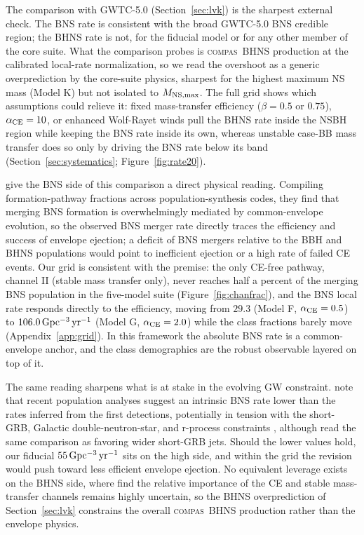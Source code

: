 \documentclass[twocolumn,amsmath]{aastex702}
\newcommand{\compas}{\textsc{compas}}
\newcommand{\Gpcyr}{{\rm Gpc^{-3}\,yr^{-1}}}
\begin{document}
The comparison with GWTC-5.0 (Section~\ref{sec:lvk}) is the sharpest external
check. The BNS rate is consistent with the broad GWTC-5.0 BNS credible region;
the BHNS rate is not, for the fiducial model or for any other member of the
core suite. What the comparison probes is \compas\ BHNS production at the
calibrated local-rate normalization, so we read the overshoot as a generic
overprediction by the core-suite physics, sharpest for the highest maximum NS
mass (Model K) but not isolated to $M_{\rm NS,max}$. The full grid shows which
assumptions could relieve it: fixed mass-transfer efficiency ($\beta = 0.5$ or
$0.75$), $\alpha_{\rm CE} = 10$, or enhanced Wolf-Rayet winds pull the BHNS
rate inside the NSBH region while keeping the BNS rate inside its own,
whereas unstable case-BB mass transfer does so only by driving the BNS rate
below its band (Section~\ref{sec:systematics}; Figure~\ref{fig:rate20}).

\citet{broekgaarden2026} give the BNS side of this comparison a direct
physical reading. Compiling formation-pathway fractions across
population-synthesis codes, they find that merging BNS formation is
overwhelmingly mediated by common-envelope evolution, so the observed BNS
merger rate directly traces the efficiency and success of envelope ejection;
a deficit of BNS mergers relative to the BBH and BHNS populations would point
to inefficient ejection or a high rate of failed CE events. Our grid is
consistent with the premise: the only CE-free pathway, channel II (stable
mass transfer only), never reaches half a percent of the merging BNS
population in the five-model suite (Figure~\ref{fig:chanfrac}), and the BNS
local rate responds directly to the efficiency, moving from $29.3$ (Model F,
$\alpha_{\rm CE} = 0.5$) to $106.0\,\Gpcyr$ (Model G, $\alpha_{\rm CE} = 2.0$)
while the class fractions barely move (Appendix~\ref{app:grid}). In this
framework the absolute BNS rate is a common-envelope anchor, and the class
demographics are the robust observable layered on top of it.

The same reading sharpens what is at stake in the evolving GW constraint.
\citet{broekgaarden2026} note that recent population analyses suggest an
intrinsic BNS rate lower than the rates inferred from the first detections,
potentially in tension with the short-GRB, Galactic double-neutron-star, and
r-process constraints \citep{fishbach2026,abac2026}, although
\citet{kunnumkai2026} read the same comparison as favoring wider short-GRB
jets. Should the lower values hold, our fiducial $55\,\Gpcyr$ sits on the
high side, and within the \citet{broekgaarden2021} grid the revision would
push toward less efficient envelope ejection. No equivalent leverage exists
on the BHNS side, where \citet{broekgaarden2026} find the relative importance
of the CE and stable mass-transfer channels remains highly uncertain, so the
BHNS overprediction of Section~\ref{sec:lvk} constrains the overall \compas\
BHNS production rather than the envelope physics.
\end{document}
